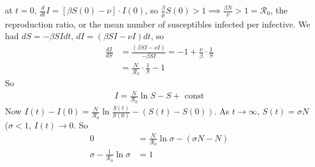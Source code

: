 \documentclass[a4paper]{article}
\begin{document}
at $t=0$, $\frac{d}{dt}I = [\beta S(0) - \nu] \cdot I(0)$, so $\frac{\beta}{\mu}S(0) > 1 \implies \frac{\beta N}{\nu}>1 = \mathcal{R}_0$, the reproduction ratio, or the mean number of susceptibles infected per infective. We had $dS = -\beta SI dt$, $dI = (\beta SI - \nu I) dt$, so
\begin{equation*}
\begin{aligned}
\frac{dI}{dS} &= \frac{(\beta SI - \nu I)}{-\beta SI} = -1 + \frac{\nu}{\beta} \cdot \frac{1}{S}\\
&= \frac{N}{\mathcal{R}_0} \cdot \frac{1}{S} - 1
\end{aligned}
\end{equation*}
So
\begin{equation*}
\begin{aligned}
I=\frac{N}{\mathcal{R}_0} \ln S - S + \text{ const}
\end{aligned}
\end{equation*}
Now $I(t)-I(0) = \frac{N}{\mathcal{R}_0} \ln \frac{S(t)}{S(0)} - (S(t)-S(0))$. As $t \to \infty$, $S(t) = \sigma N$ ($\sigma < 1$, $I(t) \to 0$. So
\begin{equation*}
\begin{aligned}
0 &= \frac{N}{\mathcal{R}_0} \ln \sigma - (\sigma N-N)\\
\sigma - \frac{1}{\mathcal{R}_0} \ln \sigma &= 1
\end{aligned}
\end{equation*}

\end{document}

